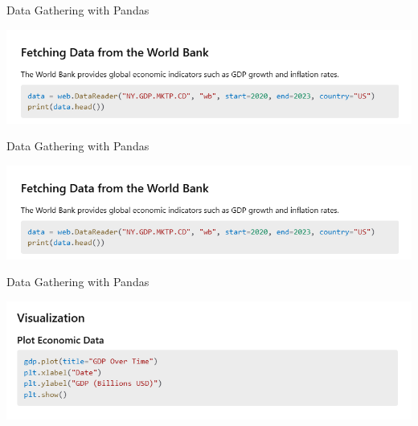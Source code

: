 \documentclass[11pt]{beamer}
\begin{document}
\begin{frame}{Data Gathering with Pandas}
	\begin{center}
	\includegraphics[scale=0.55]{../05-pictures/lesson-1-3_pic_6.png}
	\end{center}
\end{frame}
\begin{frame}{Data Gathering with Pandas}
	\begin{center}
	\includegraphics[scale=0.55]{../05-pictures/lesson-1-3_pic_7.png}
	\end{center}
\end{frame}
\begin{frame}{Data Gathering with Pandas}
	\begin{center}
	\includegraphics[scale=0.55]{../05-pictures/lesson-1-3_pic_8.png}
	\end{center}
\end{frame}
\end{document}

